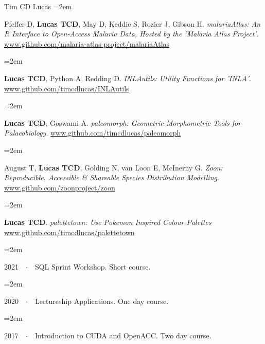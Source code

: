 \documentclass{scrartcl}
\newcommand{\Description}[1]{\hangindent=2em\hangafter=0\noindent\raggedright\footnotesize{#1}\par\normalsize\vspace{1em}} %
\begin{document}
\begin{cv}{Tim {\Large CD} Lucas}
\Description{Pfeffer D, \textbf{Lucas TCD}, May D, Keddie S, Rozier J, Gibson H. \emph{malariaAtlas: An R Interface to Open-Access Malaria Data, Hosted by the 'Malaria Atlas Project'}. \url{www.github.com/malaria-atlas-project/malariaAtlas}}

\Description{\textbf{Lucas TCD}, Python A, Redding D. \emph{INLAutils: Utility Functions for 'INLA'}. \url{www.github.com/timcdlucas/INLAutils}}


\Description{\textbf{Lucas TCD}, Goswami A. \emph{paleomorph: Geometric Morphometric Tools for Palaeobiology}. \url{www.github.com/timcdlucas/paleomorph}}

\Description{August T, \textbf{Lucas TCD}, Golding N, van Loon E, McInerny G. \emph{Zoon: Reproducible, Accessible \& Shareable Species Distribution Modelling}. \url{www.github.com/zoonproject/zoon}}

\Description{\textbf{Lucas TCD}. \emph{palettetown: Use Pokemon Inspired Colour Palettes} \url{www.github.com/timcdlucas/palettetown}}





\vspace{1em} %


{\color{Maroon}}\vspace{1em}

\Description{2021\ \ $\cdotp$\ \ SQL Sprint Workshop. Short course.}
\vspace{-0.5em} %
\Description{2020\ \ $\cdotp$\ \ Lectureship Applications. One day course.}
\vspace{-0.5em} %
\Description{2017\ \ $\cdotp$\ \ Introduction to CUDA and OpenACC. Two day course.}
\vspace{-0.5em} %

\vspace{1em} %


{\color{Maroon}}\vspace{-1em}


\end{cv}
\end{document}
